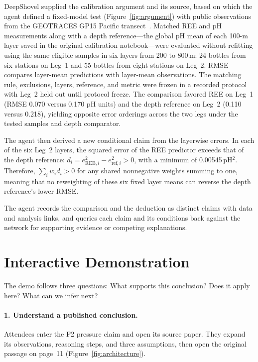 \documentclass[sigconf,screen,review]{acmart}
\begin{document}
DeepShovel supplied the calibration argument and its source, based on which the agent defined a fixed-model test (Figure~\ref{fig:argument}) with public observations from the GEOTRACES GP15 Pacific transect~\cite{gp15}. Matched REE and pH measurements along with a depth reference---the global pH mean of each 100-m layer saved in the original calibration notebook---were evaluated without refitting using the same eligible samples in six layers from 200 to 800\,m: 24 bottles from six stations on Leg~1 and 55 bottles from eight stations on Leg~2. RMSE compares layer-mean predictions with layer-mean observations. The matching rule, exclusions, layers, reference, and metric were frozen in a recorded protocol with Leg~2 held out until protocol freeze. The comparison favored REE on Leg~1 (RMSE 0.070 versus 0.170 pH units) and the depth reference on Leg~2 (0.110 versus 0.218), yielding opposite error orderings across the two legs under the tested samples and depth comparator.

The agent then derived a new conditional claim from the layerwise errors. In each of the six Leg~2 layers, the squared error of the REE predictor exceeds that of the depth reference: \mbox{$d_i=e_{\mathrm{REE},i}^2-e_{\mathrm{ref},i}^2>0$}, with a minimum of 0.00545\,pH$^2$. Therefore, $\sum_i w_i d_i>0$ for any shared nonnegative weights summing to one, meaning that no reweighting of these six fixed layer means can reverse the depth reference's lower RMSE.

The agent records the comparison and the deduction as distinct claims with data and analysis links, and queries each claim and its conditions back against the network for supporting evidence or competing explanations.

\section{Interactive Demonstration}
\label{sec:demo}
The demo follows three questions: What supports this conclusion? Does it apply here? What can we infer next?

\paragraph{1. Understand a published conclusion.}
Attendees enter the F2 pressure claim and open its source paper. They expand its observations, reasoning steps, and three assumptions, then open the original passage on page~11 (Figure~\ref{fig:architecture}).
\end{document}
